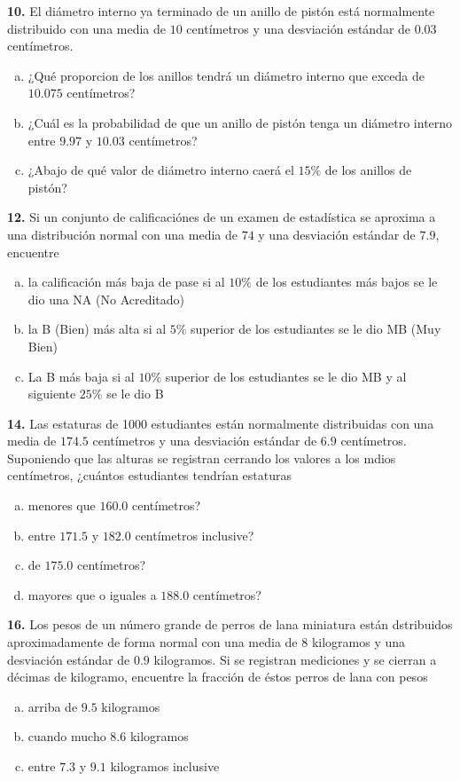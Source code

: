 \documentclass[12pt, letterpaper]{article}
\begin{document}
    \textbf{10. }El diámetro interno ya terminado de un anillo de pistón está normalmente distribuido con una media de $10$
    centímetros y una desviación estándar de $0.03$ centímetros.
        \begin{enumerate}[a)]
            \item ¿Qué proporcion de los anillos tendrá un diámetro interno que exceda de $10.075$ centímetros?
            \item ¿Cuál es la probabilidad de que un anillo de pistón tenga un diámetro interno entre $9.97$ y $10.03$
                    centímetros?
            \item ¿Abajo de qué valor de diámetro interno caerá el $15\%$ de los anillos de pistón?
        \end{enumerate}\vskip1cm

    \textbf{12. }Si un conjunto de calificaciónes de un examen de estadística se aproxima a una distribución normal con
    una media de $74$ y una desviación estándar de $7.9$, encuentre
        \begin{enumerate}[a)]
            \item la calificación más baja de pase si al $10\%$ de los estudiantes más bajos se le dio una NA (No Acreditado)
            \item la B (Bien) más alta si al $5\%$ superior de los estudiantes se le dio MB (Muy Bien)
            \item La B más baja si al $10\%$ superior de los estudiantes se le dio MB y al siguiente $25\%$ se le dio B
        \end{enumerate}\vskip1cm

    \textbf{14. }Las estaturas de 1000 estudiantes están normalmente distribuidas con una media de $174.5$ centímetros y
    una desviación estándar de $6.9$ centímetros. Suponiendo  que las alturas se registran cerrando los valores a los mdios
    centímetros, ¿cuántos estudiantes tendrían estaturas
        \begin{enumerate}[a)]
            \item menores que $160.0$ centímetros?
            \item entre $171.5$ y $182.0$ centímetros inclusive?
            \item de $175.0$ centímetros?
            \item mayores que o iguales a $188.0$ centímetros?
        \end{enumerate}\vskip1cm

    \textbf{16. }Los pesos de un número grande de perros de lana miniatura están dstribuidos aproximadamente de forma normal
    con una media de $8$ kilogramos y  una desviación estándar de $0.9$ kilogramos. Si se registran mediciones y se cierran
    a décimas de kilogramo, encuentre la fracción de éstos perros de lana con pesos
        \begin{enumerate}[a)]
            \item arriba de $9.5$ kilogramos
            \item cuando mucho $8.6$ kilogramos
            \item entre $7.3$ y $9.1$ kilogramos inclusive
        \end{enumerate}\vskip1cm
\end{document}

